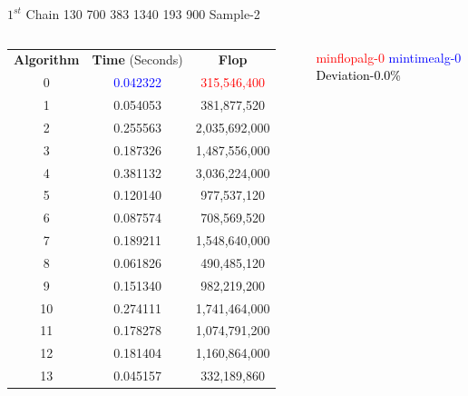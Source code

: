 \documentclass[10pts]{beamer}
\begin{document}
	    \begin{frame}{$1^{st}$ Chain 130 700 383 1340 193 900 \hspace{75pt}   Sample-2}
	    	\begin{columns}
	    		
	    		\begin{tabular}{c | c | c}
	    			\textbf{Algorithm}  & \textbf{Time} (Seconds) & \textbf{Flop}\\		
	    			0 	&	\textcolor{blue}{0.042322} 	&	\textcolor{red}{315,546,400} \\			
	    			1 	&	0.054053 	&	381,877,520 	\\	
	    			2 	&	0.255563 	&	2,035,692,000 	\\	
	    			3 	&	0.187326 	&	1,487,556,000 	\\		
	    			4 	&	0.381132 	&	3,036,224,000 	\\		
	    			5 	&	0.120140 	&	977,537,120 	\\		
	    			6 	&	0.087574 	&	708,569,520 	\\		
	    			7 	&	0.189211 	&	1,548,640,000 	\\		
	    			8 	&	0.061826 	&	490,485,120 	\\		
	    			9 	&	0.151340 	&	982,219,200 	\\		
	    			10 	&	0.274111 	&	1,741,464,000 	\\		
	    			11 	&	0.178278 	&	1,074,791,200 	\\		
	    			12 	&	0.181404 	&	1,160,864,000 	\\		
	    			13 	&	0.045157 	&	332,189,860	\\
	    			
	    		\end{tabular}
	    		
	    		
	    		\textcolor{red}{min\textunderscore flop\textunderscore alg-0}
	    		\textcolor{blue}{min\textunderscore time\textunderscore alg-0}
	    		\textcolor{black}{Deviation-0.0\%}
	    	\end{columns}
	    \end{frame} 
	    
\end{document}
